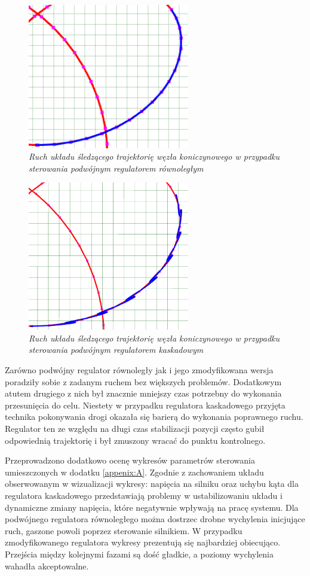 \documentclass[12pt, oneside]{report}
\theoremstyle{definition}
\begin{document}
\begin{figure}[H]
	\centering
		\includegraphics[width = 200pt]{TrajectoryTrefoilKnotGood} 
		\caption{\textit{Ruch układu śledzącego trajektorię węzła koniczynowego w przypadku sterowania podwójnym regulatorem równoległym}}
		\label{TrajectoryTrefoilKnotGood}
\end{figure}

\begin{figure}[H]
	\centering
		\includegraphics[width = 200pt]{TrajectoryTrefoilKnotWrong} 
		\caption{\textit{Ruch układu śledzącego trajektorię węzła koniczynowego w przypadku sterowania podwójnym regulatorem kaskadowym}}
		\label{TrajectoryTrefoilKnotWrong}
\end{figure}

Zarówno podwójny regulator równoległy jak i jego zmodyfikowana wersja poradziły sobie z zadanym ruchem bez większych problemów. Dodatkowym atutem drugiego z nich był znacznie mniejszy czas potrzebny do wykonania przesunięcia do celu. Niestety w przypadku regulatora kaskadowego przyjęta technika pokonywania drogi okazała się barierą do wykonania poprawnego ruchu. Regulator ten ze względu na długi czas stabilizacji pozycji często gubił odpowiednią trajektorię i był zmuszony wracać do punktu kontrolnego.

Przeprowadzono dodatkowo ocenę wykresów parametrów sterowania umieszczonych w dodatku \ref{appenix:A}. Zgodnie z zachowaniem układu obserwowanym w wizualizacji wykresy: napięcia na silniku oraz uchybu kąta dla regulatora kaskadowego przedstawiają problemy w ustabilizowaniu układu i dynamiczne zmiany napięcia, które negatywnie wpływają na pracę systemu. Dla podwójnego regulatora równoległego można dostrzec drobne wychylenia inicjujące ruch, gaszone powoli poprzez sterowanie silnikiem. W przypadku zmodyfikowanego regulatora wykresy prezentują się najbardziej obiecująco. Przejścia między kolejnymi fazami są dość gładkie, a poziomy wychylenia wahadła akceptowalne.
\end{document}
